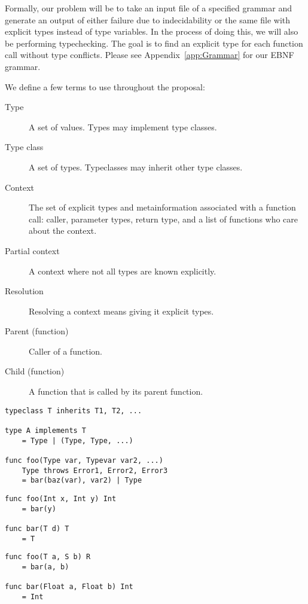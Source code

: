 \documentclass{acm_proc_article-sp}
\begin{document}

Formally, our problem will be to take an input file of a specified grammar and
generate an output of either failure due to indecidability or the same file
with explicit types instead of type variables. In the process of doing this, we
will also be performing typechecking. The goal is to find an explicit type for
each function call without type conflicts. Please see Appendix~\ref{app:Grammar}
for our EBNF grammar.

We define a few terms to use throughout the proposal:
\begin{description}
	\item[Type] A set of values. Types may implement type classes.
	\item[Type class] A set of types. Typeclasses may inherit other type classes.
	\item[Context] The set of explicit types and metainformation associated
		with a function call: caller, parameter types, return type,
		and a list of functions who care about the context.
	\item[Partial context] A context where not all types are known explicitly.
	\item[Resolution] Resolving a context means giving it explicit types.
	\item[Parent (function)] Caller of a function.
	\item[Child (function)] A function that is called by its parent function.
\end{description}

\begin{lstlisting}[caption=Grammar displayed informally,style=paratype]
typeclass T inherits T1, T2, ...

type A implements T
    = Type | (Type, Type, ...)

func foo(Type var, Typevar var2, ...)
    Type throws Error1, Error2, Error3
    = bar(baz(var), var2) | Type
\end{lstlisting}

\begin{lstlisting}[caption=Explicit Context Provided by Parents,style=paratype]
func foo(Int x, Int y) Int
    = bar(y)

func bar(T d) T
    = T
\end{lstlisting}

\begin{lstlisting}[caption=Explicit Context Provided by Child,style=paratype]
func foo(T a, S b) R
    = bar(a, b)

func bar(Float a, Float b) Int
    = Int
\end{lstlisting}
\end{document}
